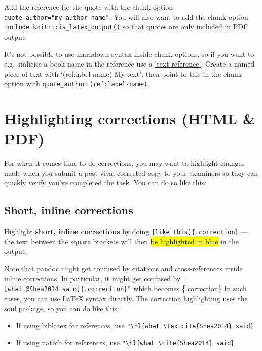 \documentclass[a4paper, nobind]{templates/ociamthesis}
\providecommand{\tightlist}{%
  \setlength{\itemsep}{0pt}\setlength{\parskip}{0pt}}
\begin{document}
Add the reference for the quote with the chunk option \texttt{quote\_author="my\ author\ name"}.
You will also want to add the chunk option \texttt{include=knitr::is\_latex\_output()} so that quotes are only included in PDF output.

It's not possible to use markdown syntax inside chunk options, so if you want to e.g.~italicise a book name in the reference use a \href{https://bookdown.org/yihui/bookdown/markdown-extensions-by-bookdown.html\#text-references}{`text reference'}: Create a named piece of text with `(ref:label-name) My text', then point to this in the chunk option with \texttt{quote\_author=\textquotesingle{}(ref:label-name)\textquotesingle{}}.

\hypertarget{highlighting-corrections-html-pdf}{%
\section{Highlighting corrections (HTML \& PDF)}\label{highlighting-corrections-html-pdf}}

For when it comes time to do corrections, you may want to highlight changes made when you submit a post-viva, corrected copy to your examiners so they can quickly verify you've completed the task.
You can do so like this:

\hypertarget{short-inline-corrections}{%
\subsection{Short, inline corrections}\label{short-inline-corrections}}

Highlight \textbf{short, inline corrections} by doing \texttt{{[}like\ this{]}\{.correction\}} --- the text between the square brackets will then \hl{be highlighted in blue} in the output.

Note that pandoc might get confused by citations and cross-references inside inline corrections.
In particular, it might get confused by \texttt{"{[}what\ @Shea2014\ said{]}\{.correction\}"} which becomes \autocite[what][ said]{Shea2014}\{.correction\}
In such cases, you can use LaTeX syntax directly.
The correction highlighting uses the \href{https://ctan.org/pkg/soul}{soul} package, so you can do like this:

\begin{itemize}
\tightlist
\item
  If using biblatex for references, use \texttt{"\textbackslash{}hl\{what\ \textbackslash{}textcite\{Shea2014\}\ said\}}
\item
  If using natbib for references, use \texttt{"\textbackslash{}hl\{what\ \textbackslash{}cite\{Shea2014\}\ said\}}
\end{itemize}
\end{document}
